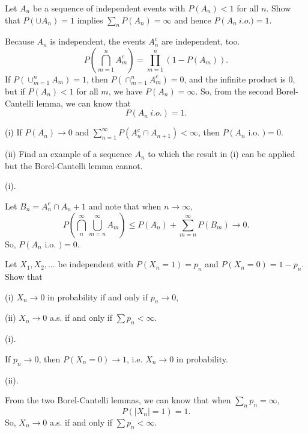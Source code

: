 \documentclass[en, normal, 11pt, black]{elegantnote}
\newenvironment{exercise}[1]{\begin{tcolorbox}[colback=black!15, colframe=black!80, breakable, title=#1]}{\end{tcolorbox}}
\newenvironment{solution}{\begin{tcolorbox}[colback=white, colframe=black!50, breakable, title=Solution. ]\setlength{\parskip}{0.8em}}{\end{tcolorbox}}
\begin{document}
    \begin{exercise}{2.3.8}
        Let $A_{n}$ be a sequence of independent events with $P\left(A_{n}\right) < 1$ for all $n$. Show that $P\left(\cup A_{n}\right)=1$ implies $\sum_{n} P\left(A_{n}\right)=\infty$ and hence $P\left(A_{n}\right.\ i.o.)=1$. 
    \end{exercise}

    \begin{solution}
        Because $A_n$ is independent, the events $A_n^c$ are independent, too. 
        \[
            P\left(\bigcap_{m=1}^nA_m^c\right)=\prod_{m=1}^n(1-P(A_m)). 
        \]
        If $P(\cup_{m=1}^nA_m) = 1$, then $P(\cap_{m=1}^nA_m^c)=0$, and the infinite product is $0$, but if $P(A_n) < 1$ for all $m$, we have $P(A_n) = \infty$. So, from the second Borel-Cantelli lemma, we can know that 
        \[
            P(A_n\ i.o.)=1. 
        \]
    \end{solution}

    \begin{exercise}{2.3.9}
        (i) If $P\left(A_{n}\right) \rightarrow 0$ and $\sum_{n=1}^{\infty} P\left(A_{n}^{c} \cap A_{n+1}\right)<\infty$, then $P\left(A_{n}\right.$ i.o. $)=0$. 
        
        (ii) Find an example of a sequence $A_{n}$ to which the result in (i) can be applied but the Borel-Cantelli lemma cannot. 
    \end{exercise}

    \begin{solution}
        (i). 

        Let $B_n =A_n^c\cap A_n+1$ and note that when $n\to\infty$, 
        \[
            P\left(\bigcap_{n}^\infty\bigcup_{m=n}^\infty A_m\right)\leqslant P(A_n)+\sum_{m=n}^\infty P(B_m)\to 0. 
        \]
        So, $P\left(A_{n}\right.$ i.o. $)=0$. 
    \end{solution}
    
    \begin{exercise}{2.3.11}
        Let $X_{1}, X_{2}, \ldots$ be independent with $P\left(X_{n}=1\right)=p_{n}$ and $P\left(X_{n}=0\right)=1-p_{n}$. Show that 
        
        (i) $X_{n} \rightarrow 0$ in probability if and only if $p_{n} \rightarrow 0$, 
        
        (ii) $X_{n} \rightarrow 0$ a.s. if and only if $\sum p_{n}<\infty$. 
    \end{exercise}

    \begin{solution}
        (i). 
        
        If $p_n\to0$, then $P(X_n=0)\to1$, i.e. $X_n\to 0$ in probability. 

        (ii). 

        From the two Borel-Cantelli lemmas, we can know that when $\sum_np_n=\infty$, 
        \[
            P(|X_n|=1)=1. 
        \]
        So, $X_{n} \rightarrow 0$ a.s. if and only if $\sum p_{n}<\infty$. 
    \end{solution}
\end{document}
